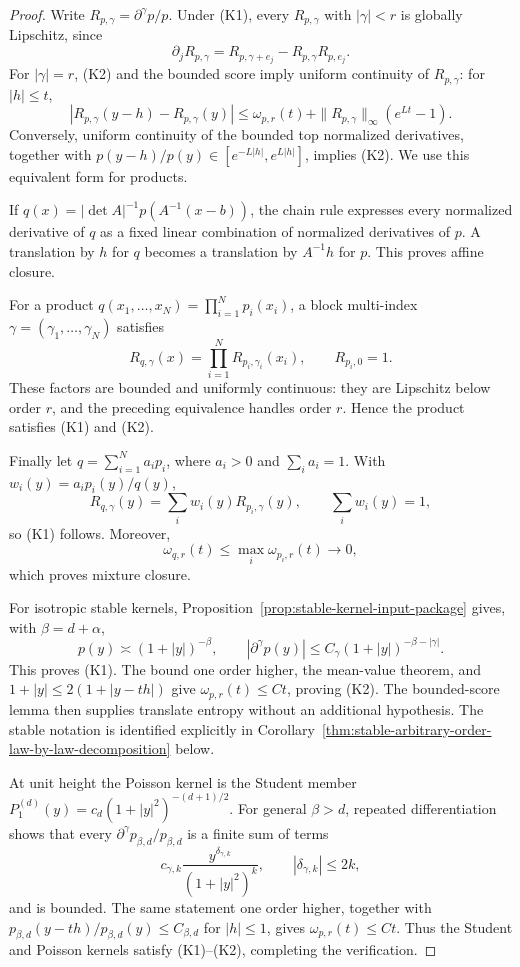 \begin{proof}
Write \(R_{p,\gamma}=\partial^\gamma p/p\).  Under \textup{(K1)}, every
\(R_{p,\gamma}\) with \(|\gamma|<r\) is globally Lipschitz, since
\[
 \partial_jR_{p,\gamma}
 =R_{p,\gamma+e_j}-R_{p,\gamma}R_{p,e_j}.
\]
For \(|\gamma|=r\), \textup{(K2)} and the bounded score imply uniform
continuity of \(R_{p,\gamma}\): for \(|h|\le t\),
\[
 |R_{p,\gamma}(y-h)-R_{p,\gamma}(y)|
 \le\omega_{p,r}(t)+\|R_{p,\gamma}\|_\infty(e^{Lt}-1).
\]
Conversely, uniform continuity of the bounded top normalized derivatives,
together with \(p(y-h)/p(y)\in[e^{-L|h|},e^{L|h|}]\), implies
\textup{(K2)}.  We use this equivalent form for products.

If \(q(x)=|\det A|^{-1}p(A^{-1}(x-b))\), the chain rule expresses every
normalized derivative of \(q\) as a fixed linear combination of normalized
derivatives of \(p\).  A translation by \(h\) for \(q\) becomes a
translation by \(A^{-1}h\) for \(p\).  This proves affine closure.

For a product \(q(x_1,\ldots,x_N)=\prod_{i=1}^Np_i(x_i)\), a block
multi-index \(\gamma=(\gamma_1,\ldots,\gamma_N)\) satisfies
\[
 R_{q,\gamma}(x)=\prod_{i=1}^N R_{p_i,\gamma_i}(x_i),
 \qquad R_{p_i,0}=1.
\]
These factors are bounded and uniformly continuous: they are Lipschitz below
order \(r\), and the preceding equivalence handles order \(r\).  Hence the
product satisfies \textup{(K1)} and \textup{(K2)}.

Finally let \(q=\sum_{i=1}^Na_ip_i\), where \(a_i>0\) and
\(\sum_i a_i=1\).  With \(w_i(y)=a_ip_i(y)/q(y)\),
\[
 R_{q,\gamma}(y)=\sum_iw_i(y)R_{p_i,\gamma}(y),
 \qquad \sum_iw_i(y)=1,
\]
so \textup{(K1)} follows.  Moreover,
\[
 \omega_{q,r}(t)
 \le\max_i\omega_{p_i,r}(t)\longrightarrow0,
\]
which proves mixture closure.

For isotropic stable kernels, Proposition~\ref{prop:stable-kernel-input-package}
gives, with \(\beta=d+\alpha\),
\[
 p(y)\asymp(1+|y|)^{-\beta},\qquad
 |\partial^\gamma p(y)|\le C_\gamma
 (1+|y|)^{-\beta-|\gamma|}.
\]
This proves \textup{(K1)}.  The bound one order higher, the mean-value
theorem, and \(1+|y|\le2(1+|y-th|)\) give
\(\omega_{p,r}(t)\le Ct\), proving \textup{(K2)}.  The bounded-score lemma
then supplies translate entropy without an additional hypothesis.  The
stable notation is identified explicitly in
Corollary~\ref{thm:stable-arbitrary-order-law-by-law-decomposition} below.

At unit height the Poisson kernel is the Student member
\(P_1^{(d)}(y)=c_d(1+|y|^2)^{-(d+1)/2}\).  For general \(\beta>d\), repeated
differentiation shows that every
\(\partial^\gamma p_{\beta,d}/p_{\beta,d}\) is a finite sum of terms
\[
 c_{\gamma,k}\frac{y^{\delta_{\gamma,k}}}{(1+|y|^2)^k},
 \qquad |\delta_{\gamma,k}|\le2k,
\]
and is bounded.  The same statement one order higher, together with
\(p_{\beta,d}(y-th)/p_{\beta,d}(y)\le C_{\beta,d}\) for \(|h|\le1\), gives
\(\omega_{p,r}(t)\le Ct\).  Thus the Student and Poisson kernels satisfy
\textup{(K1)}--\textup{(K2)}, completing the verification.
\end{proof}

